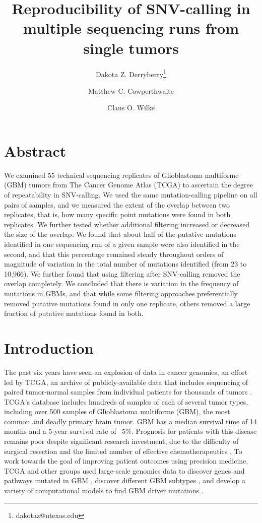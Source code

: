 \documentclass[11pt]{article} %
\title{Reproducibility of SNV-calling in multiple sequencing runs from single tumors}
\author[1]{Dakota Z. Derryberry\thanks{dakotaz@utexas.edu}}
\author[3]{Matthew C. Cowperthwaite}
\author[1,2]{Claus O. Wilke}
\affil[1]{The University of Texas at Austin, Cell \& Molecular Biology}
\affil[2]{The University of Texas at Austin, Integrative Biology}
\affil[3]{St. David's NeuroTexas Institute Research Foundation}
\begin{document}
\maketitle

\section*{Abstract}

We examined 55 technical sequencing replicates of Glioblastoma multiforme (GBM) tumors from The Cancer Genome Atlas (TCGA) to ascertain the degree of repeatability in SNV-calling. We used the same mutation-calling pipeline on all pairs of samples, and we measured the extent of the overlap between two replicates, that is, how many specific point mutations were found in both replicates. We further tested whether additional filtering increased or decreased the size of the overlap.  We found that about half of the putative mutations identified in one sequencing run of a given sample were also identified in the second, and that this percentage remained steady throughout orders of magnitude of variation in the total number of mutations identified (from 23 to 10,966). We further found that using filtering after SNV-calling removed the overlap completely. We concluded that there is variation in the frequency of mutations in GBMs, and that while some filtering approaches preferentially removed putative mutations found in only one replicate, others removed a large fraction of putative mutations found in both.

\section*{Introduction}

The past six years have seen an explosion of data in cancer genomics, an effort led by TCGA, an archive of publicly-available data that includes sequencing of paired tumor-normal samples from individual patients for thousands of tumors \citep{TCGA-GBM, TCGA-GBM-13}. TCGA's database includes hundreds of samples of each of several tumor types, including over 500 samples of Glioblastoma multiforme (GBM), the most common and deadly primary brain tumor. GBM has a median survival time of 14 months and a 5-year survival rate of ~5\%. Prognosis for patients with this disease remains poor despite significant research investment, due to the difficulty of surgical resection and the limited number of effective chemotherapeutics \citep{GBM-stats}. To work towards the goal of improving patient outcomes using precision medicine, TCGA and other groups \citep{Parsons} used large-scale genomics data to discover genes and pathways mutated in GBM \citep{pathways}, discover different GBM subtypes \citep{subtypes}, and develop a variety of computational models to find GBM driver mutations \citep{drivers}.
\end{document}
